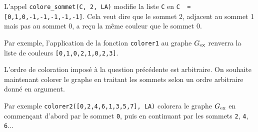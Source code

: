L'appel \lstinline{colore_sommet(C, 2, LA)} modifie la liste \lstinline{C} en \lstinline{C  = [0,1,0,-1,-1,-1,-1,-1]}. Cela veut dire que le sommet 2, adjacent au sommet 1 mais pas au sommet 0, a reçu la même couleur que le sommet 0.
\ifprof
\begin{corrige}

\end{corrige}
\else

\fi


Par exemple, l'application de la fonction \lstinline{colorer1} au graphe ${G}_{\text{ex}}$ renverra la liste de couleurs \lstinline{[0,1,0,2,1,0,2,3]}.
\ifprof
\begin{corrige}

\end{corrige}
\else
\fi


L'ordre de coloration imposé à la question précédente est arbitraire. On souhaite maintenant colorer le graphe en traitant les sommets selon un ordre arbitraire donné en argument.


Par exemple \lstinline{colorer2([0,2,4,6,1,3,5,7], LA)} colorera le graphe ${G}_{\text{ex}}$ en commençant d'abord par le sommet \lstinline{0}, puis en continuant par les sommets \lstinline{2}, \lstinline{4}, \lstinline{6}...
\ifprof
\begin{corrige}

\end{corrige}
\else
\fi

\ifprof
\begin{corrige}

\end{corrige}
\else
\fi

